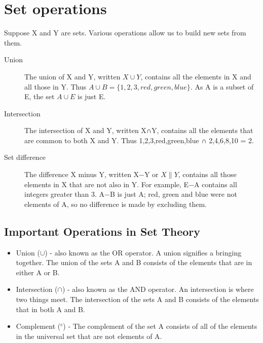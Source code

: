 
\section{Set operations}

Suppose X and Y are sets. Various operations allow us to build new sets from them.

\begin{description}
\item[Union]
The union of X and Y, written $X\cup Y$, contains all the elements in X and all those in Y. Thus $A \cup B = \{1, 2, 3, red, green, blue\}$. As A is a subset of E, the set $A \cup E$ is just E.

\item[Intersection]

The intersection of X and Y, written X∩Y, contains all the elements that are common to both X and Y. Thus {1,2,3,red,green,blue} ∩ {2,4,6,8,10} = {2}.

\item[Set difference]

The difference X minus Y, written X−Y or $X\|Y$, contains all those elements in X that are not also in Y. For example, E−A contains all integers greater than 3. A−B is just A; red, green and blue were not elements of A, so no difference is made by excluding them.
\end{description}



\subsection{Important Operations in Set Theory}

\begin{itemize}
\item Union ($\cup$) - also known as the OR operator. A union signifies a bringing together. The union of the sets A and B consists of the elements that are in either A or B.
\item Intersection ($\cap$) - also known as the AND operator. An intersection is where two things meet. The intersection of the sets A and B consists of the elements that in both A and B.
\item Complement ($^{c}$) - The complement of the set A consists of all of the elements in the universal set that are not elements of A.
\end{itemize}




